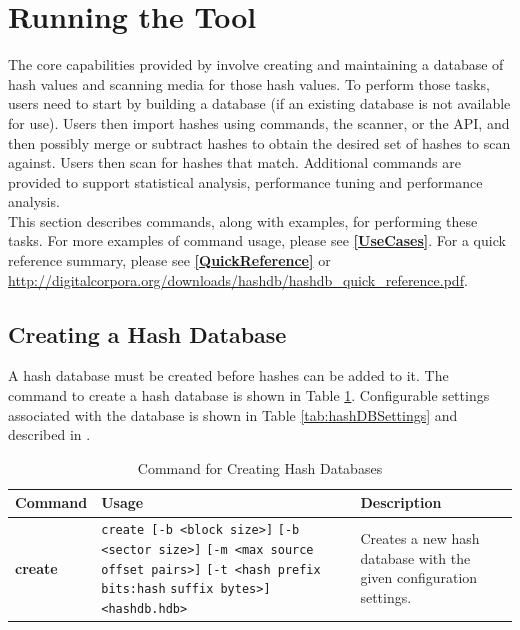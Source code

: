 \documentclass[11pt,fleqn]{article} %
\begin{document}
\section {Running the \hdb Tool}
\label{Running}
The core capabilities provided by \hdb involve creating and maintaining a database of hash values and scanning media for those hash values. To perform those tasks, \hdb users need to start by building a database (if an existing database is not available for use).
Users then import hashes using \hdb commands, the \hdb \bulk scanner, or the \hdb API, and then possibly merge or subtract hashes to obtain the desired set of hashes to scan against.
Users then scan for hashes that match.
Additional commands are provided to support statistical analysis, performance tuning and performance analysis.\\

This section describes \hdb commands, along with examples, for performing these tasks.
For more examples of command usage, please see \textbf{\autoref{UseCases}}.
For a \hdb quick reference summary, please see \textbf{\autoref{QuickReference}}
or \url{http://digitalcorpora.org/downloads/hashdb/hashdb_quick_reference.pdf}.

\subsection{Creating a Hash Database}
\label{Creating}
A hash database must be created before hashes can be added to it.
The command to create a hash database is shown in Table \ref{tab:createDatabase}.
Configurable settings associated with the database is shown in Table \ref{tab:hashDBSettings} and described in \textbf{}.\\
\begin{table}[!ht]
\centering
\caption{Command for Creating Hash Databases}
\label{tab:createDatabase}
\begin{tabular}{|p{2.5 cm}|p{7 cm}|p{4 cm}|}
\hline \hline
\textbf{Command} & \textbf{Usage} & \textbf{Description} \\
\hline
\textbf{create} & \verb+create [-b <block size>]+ \verb+[-b <sector size>]+ \verb+[-m <max source offset pairs>]+ \verb+[-t <hash prefix bits:hash+ \verb+suffix bytes>]+ \verb+<hashdb.hdb>+ & Creates a new hash database with the given configuration settings.\\
\hline
\end{tabular}
\end{table}
\end{document}
